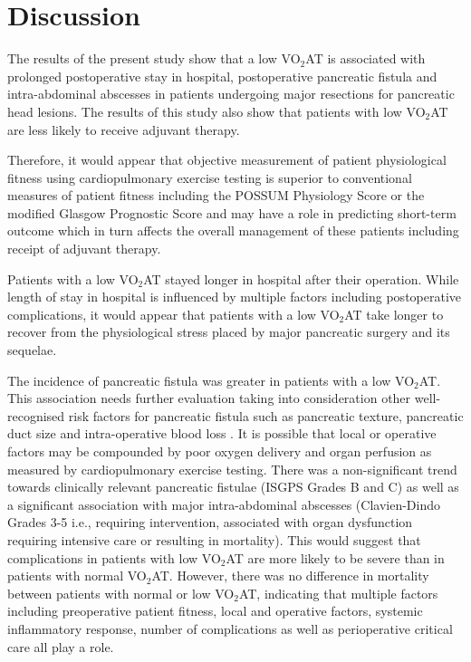 \clearpage

\section{Discussion}
The results of the present study show that a low VO$_2$AT is associated with prolonged postoperative stay in hospital, postoperative pancreatic fistula and intra-abdominal abscesses in patients undergoing major resections for pancreatic head lesions. The results of this study also show that patients with low VO$_2$AT are less likely to receive adjuvant therapy. 

Therefore, it would appear that objective measurement of patient physiological fitness using cardiopulmonary exercise testing is superior to conventional measures of patient fitness including the POSSUM Physiology Score or the modified Glasgow Prognostic Score and may have a role in predicting short-term outcome which in turn affects the overall management of these patients including receipt of adjuvant therapy.

Patients with a low VO$_2$AT stayed longer in hospital after their operation. While length of stay in hospital is influenced by multiple factors including postoperative complications, it would appear that patients with a low VO$_2$AT take longer to recover from the physiological stress placed by major pancreatic surgery and its sequelae.

The incidence of pancreatic fistula was greater in patients with a low VO$_2$AT. This association needs further evaluation taking into consideration other well-recognised risk factors for pancreatic fistula such as pancreatic texture, pancreatic duct size and intra-operative blood loss \parencite{braga_prognostic_2011, pratt_possum_2008, winter_1423_2006}. It is possible that local or operative factors may be compounded by poor oxygen delivery and organ perfusion as measured by cardiopulmonary exercise testing. There was a non-significant trend towards clinically relevant pancreatic fistulae (ISGPS Grades B and C) as well as a significant association with major intra-abdominal abscesses (Clavien-Dindo Grades 3-5 i.e., requiring intervention, associated with organ dysfunction requiring intensive care or resulting in mortality). This would suggest that complications in patients with low VO$_2$AT are more likely to be severe than in patients with normal VO$_2$AT. However, there was no difference in mortality between patients with normal or low VO$_2$AT, indicating that multiple factors including preoperative patient fitness, local and operative factors, systemic inflammatory response, number of complications as well as perioperative critical care all play a role.

